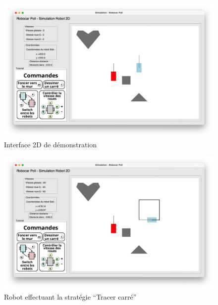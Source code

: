 \documentclass[12pt]{article}
\begin{document}
\begin{center}
\begin{figure}[p] 
  \centering 
  \includegraphics[width=1\linewidth]{image5.jpg} 
  \caption{Interface 2D de démonstration}
  \label{fig:exemple} 
\end{figure}

\begin{figure}[p] 
  \centering 
  \includegraphics[width=1\linewidth]{image6.jpg} 
  \caption{Robot effectuant la stratégie “Tracer carré”}  
  \label{fig:exemple} 
\end{figure}


\end{center}
\end{document}
